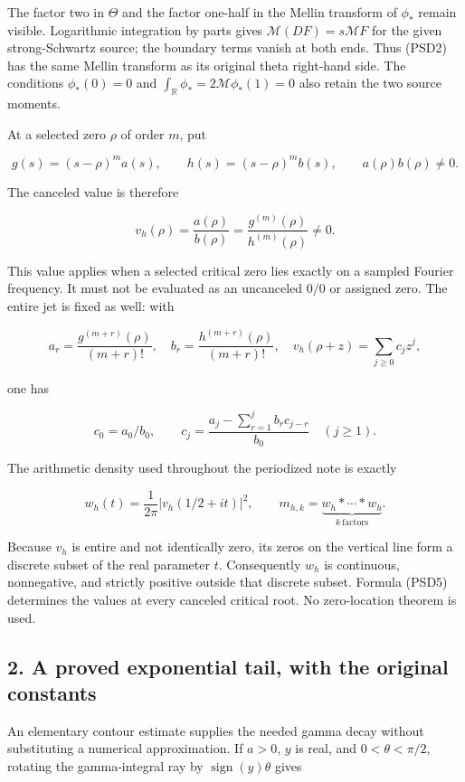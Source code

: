 \documentclass{article}
\begin{document}
The factor two in \(\Theta\) and the factor one-half in the Mellin transform of \(\phi_*\) remain visible. Logarithmic integration by parts gives \(\mathcal M(DF)=s\mathcal MF\) for the given strong-Schwartz source; the boundary terms vanish at both ends. Thus (PSD2) has the same Mellin transform as its original theta right-hand side. The conditions \(\phi_*(0)=0\) and \(\int_{\mathbb R}\phi_*=2\mathcal M\phi_*(1)=0\) also retain the two source moments.

At a selected zero \(\rho\) of order \(m\), put

\[
g(s)=(s-\rho)^m a(s),\qquad h(s)=(s-\rho)^m b(s),
\qquad a(\rho)b(\rho)\ne0.
\]

The canceled value is therefore

\[
v_h(\rho)=\frac{a(\rho)}{b(\rho)}
=\frac{g^{(m)}(\rho)}{h^{(m)}(\rho)}\ne0.
\tag{PSD5}
\]

This value applies when a selected critical zero lies exactly on a sampled Fourier frequency. It must not be evaluated as an uncanceled \(0/0\) or assigned zero. The entire jet is fixed as well: with

\[
a_r=\frac{g^{(m+r)}(\rho)}{(m+r)!},\quad
b_r=\frac{h^{(m+r)}(\rho)}{(m+r)!},\quad
v_h(\rho+z)=\sum_{j\ge0}c_jz^j,
\]

one has

\[
c_0=a_0/b_0,\qquad
c_j=\frac{a_j-\sum_{r=1}^j b_r c_{j-r}}{b_0}\quad(j\ge1).
\tag{PSD6}
\]

The arithmetic density used throughout the periodized note is exactly

\[
w_h(t)=\frac1{2\pi}\left|v_h(1/2+it)\right|^2,
\qquad m_{h,k}=\underbrace{w_h*\cdots*w_h}_{k\ \mathrm{factors}}.
\tag{PSD7}
\]

Because \(v_h\) is entire and not identically zero, its zeros on the vertical line form a discrete subset of the real parameter \(t\). Consequently \(w_h\) is continuous, nonnegative, and strictly positive outside that discrete subset. Formula (PSD5) determines the values at every canceled critical root. No zero-location theorem is used.

\subsection{2. A proved exponential tail, with the original constants}\label{a-proved-exponential-tail-with-the-original-constants}

An elementary contour estimate supplies the needed gamma decay without substituting a numerical approximation. If \(a>0\), \(y\) is real, and \(0<\theta<\pi/2\), rotating the gamma-integral ray by \(\operatorname{sign}(y) \theta\) gives
\end{document}

